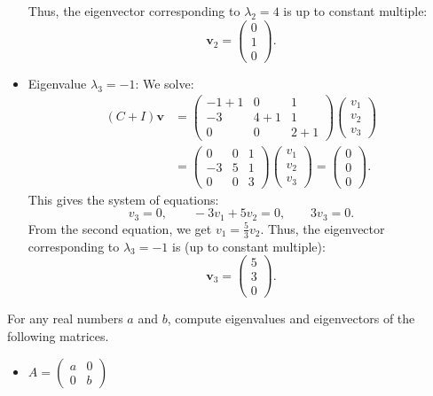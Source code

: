 \documentclass[addpoints, 12pt,answers]{exam}
\begin{document}
\begin{questions}
\begin{solution}
\begin{itemize}
  Thus, the eigenvector corresponding to $\lambda_2 = 4$ is up to constant multiple:
  \[ \mathbf{v}_2 = \begin{pmatrix} 0 \\ 1 \\ 0 \end{pmatrix}. \]

  \item {Eigenvalue $\lambda_3 = -1$:}
  We solve:
  \begin{align*}
    (C + I) \mathbf{v}
    &= \begin{pmatrix} -1 + 1 & 0 & 1 \\ -3 & 4 + 1 & 1 \\ 0 & 0 & 2 + 1 \end{pmatrix} \begin{pmatrix} v_1 \\ v_2 \\ v_3 \end{pmatrix} \\
    &= \begin{pmatrix} 0 & 0 & 1 \\ -3 & 5 & 1 \\ 0 & 0 & 3 \end{pmatrix} \begin{pmatrix} v_1 \\ v_2 \\ v_3 \end{pmatrix} = \begin{pmatrix} 0 \\ 0 \\ 0 \end{pmatrix}.
  \end{align*}
  This gives the system of equations:
  \[ v_3 = 0, \qquad -3v_1 + 5v_2 = 0, \qquad 3v_3 = 0. \]
  From the second equation, we get $v_1 = \frac{5}{3}v_2$.
  Thus, the eigenvector corresponding to $\lambda_3 = -1$ is (up to constant multiple):
  \[ \mathbf{v}_3 = \begin{pmatrix} 5 \\ 3 \\ 0 \end{pmatrix}. \]
  \end{itemize}
\end{solution}


\question For any real numbers $a$ and $b$, compute eigenvalues and eigenvectors of the following matrices.
\begin{itemize}
\item $A =  \begin{pmatrix} a & 0\\0 & b\end{pmatrix}$


\end{itemize}
\end{questions}
\end{document}
